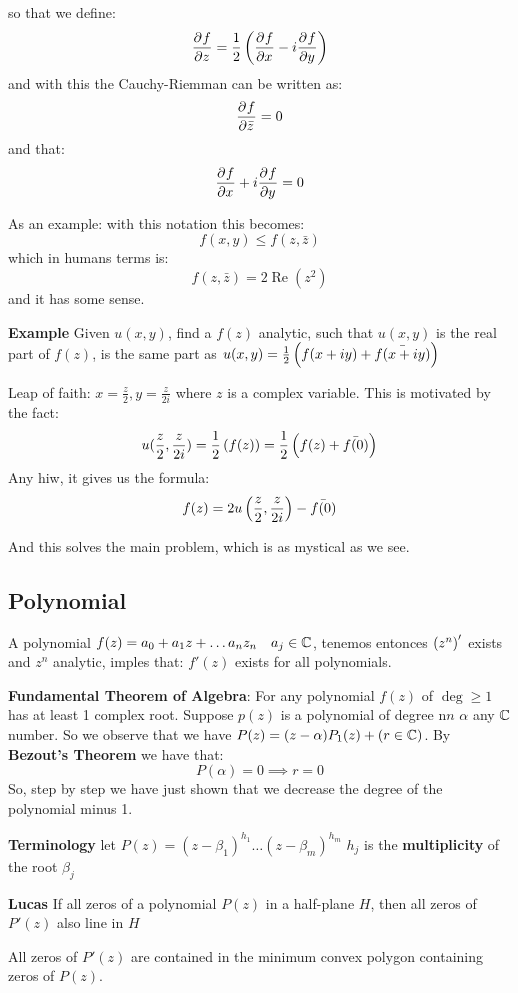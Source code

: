 so that we define:
\[  \frac{\partial^{} f}{\partial z^{}} = \frac{1}{2}\left( \frac{\partial^{} f}{\partial x^{}} - i \frac{\partial^{} f}{\partial y^{}} \right) \]
and with this the Cauchy-Riemman can be written as:
\[ \frac{\partial^{} f}{\partial \bar{z}^{}} = 0 \]
and that:
\[ \frac{\partial^{} f}{\partial x^{}} + i \frac{\partial^{} f}{\partial y^{}} = 0 \]

As an example: with this notation this becomes:
\[ f(x,y) \leq f(z,\bar{z}) \]
which in humans terms is:
\[ f(z,\bar{z}) = 2 \operatorname{Re}(z^2) \]
and it has some sense.

\textbf{Example} Given $u(x,y)$, find a $f(z)$ analytic, such that $u(x,y)$ is the real part of $f(z) $, is the same part as
$ u(x,y) = \frac{1}{2}\left( f(x+iy) + \bar{f(x+iy)} \right)$

Leap of faith: $ x = \frac{z}{2}, y = \frac{z}{2i} $ where $z$ is a complex variable.
This is motivated by the fact:
\[ u(\frac{z}{2}, \frac{z}{2i}) =\frac{1}{2}\left( f(z) \right) = \frac{1}{2}\left( f(z) + \bar{f(0)} \right) \]
Any hiw, it gives us the formula:
\[ f(z) = 2u\left( \frac{z}{2}, \frac{z}{2i} \right) - \bar{f(0)} \]

And this solves the main problem, which is as mystical as we see.

\subsection*{Polynomial}\label{sec:polynomial}
A polynomial $ f(z) = a_0 + a_1 z + \ldots a_n z_n \quad a_j \in \mathbb{C} $, tenemos entonces $\left( z^n \right)'$ exists and $z^n$ analytic, imples that: $f'(z) $ exists for all polynomials.

\textbf{Fundamental Theorem of Algebra}: For any polynomial $f(z)$ of $\operatorname{deg} \geq 1 $ has at least 1 complex root. Suppose $ p(z) $ is a polynomial of degree n$n$ $\alpha$ any $\mathbb{C} $ number.
So we observe that we have $P(z) = (z-\alpha)P_1(z)  + (r \in \mathbb{C}) $. 
By \textbf{Bezout's Theorem}  we have that:
\[ P(\alpha) = 0 \implies r = 0  \]
So, step by step we have just shown that we decrease the degree of the polynomial minus 1.

\textbf{Terminology} let $ P(z) = (z - \beta_1)^{h_1} \ldots (z - \beta_m)^{h_m} $
$h_j$ is the \textbf{multiplicity } of the root $ \beta_j$

\begin{thm}
	\textbf{Lucas} If all zeros of a polynomial  $P(z)$ in a half-plane $H$, then all zeros of $P'(z)$ also line in $H$
\end{thm}
\begin{corolary}
	All zeros of $ P'(z) $ are contained in the minimum convex polygon containing zeros of $P(z)$.
\end{corolary}

